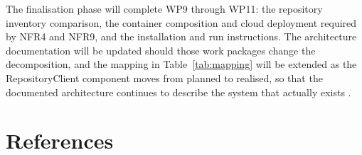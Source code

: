 \documentclass[a4paper,11pt]{article}
\begin{document}
The finalisation phase will complete WP9 through WP11: the repository inventory
comparison, the container composition and cloud deployment required by NFR4 and
NFR9, and the installation and run instructions. The architecture documentation
will be updated should those work packages change the decomposition, and the
mapping in Table~\ref{tab:mapping} will be extended as the RepositoryClient
component moves from planned to realised, so that the documented architecture
continues to describe the system that actually exists \citep{Ford2021}.

\newpage

\section*{References}
\end{document}
